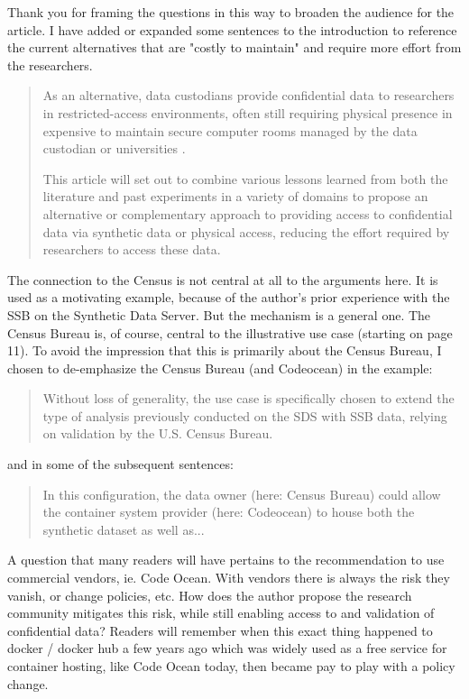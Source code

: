 \begin{response}

Thank you for framing the questions in this way to broaden the audience for the article. I have added or expanded some sentences to the introduction to reference the current alternatives that are "costly to maintain" and require more effort from the researchers.

\begin{quote}
As an alternative, data custodians provide confidential data to researchers in restricted-access environments, often still requiring physical presence in expensive to maintain secure computer rooms managed by the data custodian or universities \citep{weinbergAccessMethodsUnited2007,vilhuberProtectingConfidentialData2024}.  

This article will set out to combine various lessons learned from both the literature and past experiments in a variety of domains to propose an alternative or complementary approach to providing access to confidential data via synthetic data or physical access, reducing the effort required by researchers to access these data. 
\end{quote}

The connection to the Census is not central at all to the arguments here. It is used as a motivating example, because of the author's prior experience with the SSB on the Synthetic Data Server. But the mechanism is a general one. The Census Bureau is, of course, central to the illustrative use case (starting on page 11). To avoid the impression that this is primarily about the Census Bureau, I chosen to  de-emphasize the Census Bureau (and Codeocean) in the example:

    \begin{quote}
Without loss of generality, the use case is specifically chosen to extend the type of analysis previously conducted on the \ac{SDS} with \ac{SSB} data, relying on validation by the U.S. Census Bureau. 
    \end{quote}

    and in some of the subsequent sentences:

    \begin{quote}
        In this configuration, the data owner (here: Census Bureau) could allow the container system provider (here: Codeocean) to house both the synthetic dataset as well as...
        \end{quote}
\end{response}

\begin{referee}
A question that many readers will have pertains to the recommendation to use commercial vendors,
ie. Code Ocean. With vendors there is always the risk they vanish, or change policies, etc. How does
the author propose the research community mitigates this risk, while still enabling access to and
validation of confidential data? Readers will remember when this exact thing happened to docker /
docker hub a few years ago which was widely used as a free service for container hosting, like Code
Ocean today, then became pay to play with a policy change.
\end{referee}

